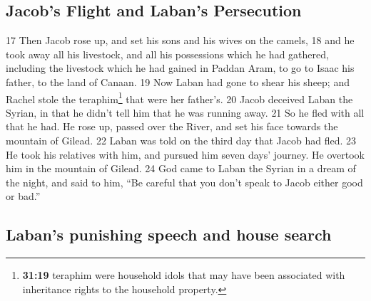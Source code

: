 \hypertarget{jacobs-flight-and-labans-persecution}{%
\subsection{Jacob's Flight and Laban's
Persecution}\label{jacobs-flight-and-labans-persecution}}

{17} Then Jacob rose up, and set his sons and his wives on the camels,
{18} and he took away all his livestock, and all his possessions which
he had gathered, including the livestock which he had gained in Paddan
Aram, to go to Isaac his father, to the land of Canaan. {19} Now Laban
had gone to shear his sheep; and Rachel stole the teraphim\footnote{\textbf{31:19}
  teraphim were household idols that may have been associated with
  inheritance rights to the household property.} that were her father's.
{20} Jacob deceived Laban the Syrian, in that he didn't tell him that he
was running away. {21} So he fled with all that he had. He rose up,
passed over the River, and set his face towards the mountain of Gilead.
{22} Laban was told on the third day that Jacob had fled. {23} He took
his relatives with him, and pursued him seven days' journey. He overtook
him in the mountain of Gilead. {24} God came to Laban the Syrian in a
dream of the night, and said to him, ``Be careful that you don't speak
to Jacob either good or bad.''

\hypertarget{labans-punishing-speech-and-house-search}{%
\subsection{Laban's punishing speech and house
search}\label{labans-punishing-speech-and-house-search}}

